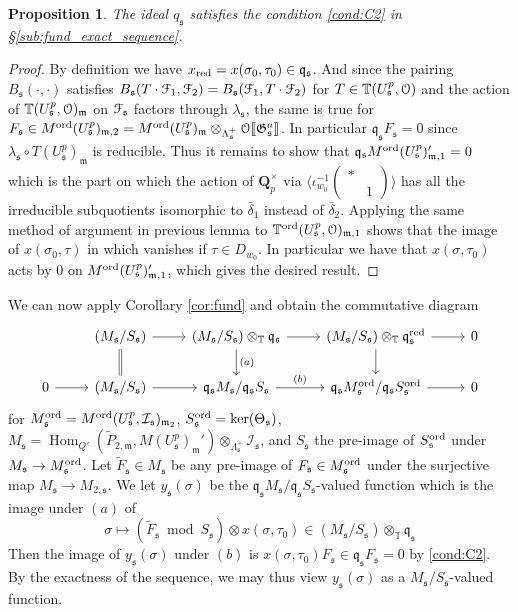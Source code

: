 \documentclass[leqno]{amsart}
\newtheorem{prop}[thm]{Proposition}
\theoremstyle{definition}
\theoremstyle{remark}
\newcommand{\smat}[1]{\left(\begin{smallmatrix} #1 \end{smallmatrix}\right)}
\newcommand{\eo}{\EuScript{O}}
\newcommand{\Qp}{\mathbf{Q}_p}
\DeclareMathOperator{\Hom}{Hom}
\newcommand{\fm}{\mathfrak{m}}
\newcommand{\fq}{\mathfrak{q}}
\newcommand{\fs}{\mathfrak{s}}
\newcommand{\red}{\textnormal{red}}
\newcommand{\xx}{x_\textnormal{red}}
\newcommand{\fG}{\mathfrak{G}}
\newcommand{\TT}{\mathbb{T}} %
\newcommand{\euF}{\EuScript{F}} %
\newcommand{\I}{\mathcal{I}} %
\newcommand{\ord}{\textnormal{ord}} %
\begin{document}
\begin{prop}
The ideal  $q_{\fs}$
satisfies the condition \ref{cond:C2}
in \S\ref{sub:fund_exact_sequence}.
\end{prop}

\begin{proof}

By definition we have $\xx=x(\sigma_0,\tau_0)\in \fq_\fs$.
And since the pairing 
$B_\fs(\cdot,\cdot)$ satisfies
$B_\fs(T\cdot \euF_1,\euF_2)=B_\fs(\euF_1,T\cdot \euF_2)$
for $T\in \TT(U^p_\fs,\eo)$
and the action of $\TT(U^p_\fs,\eo)_\fm$
on $\euF_\fs$ factors through $\lambda_\fs$,
the same is true for 
$F_\fs\in M^{\ord}(U^p_\fs)_{\fm,2}=
M^{\ord}(U^p_\fs)_\fm\otimes_{\Lambda^+_\fs}
\eo\llbracket\fG_\fs^a\rrbracket$.
In particular $\fq_\fs F_\fs=0$
since $\lambda_\fs\circ T(U^p_\fs)_\fm$
is reducible.
Thus it remains to show that 
$\fq_\fs M^{\ord}(U^p_\fs)'_{\fm,1}=0$
which is the part on which the action of $\Qp^\times$
via $\langle\iota_{w_0}^{-1}\smat{*&\\&1}\rangle$
has all the irreducible subquotients
isomorphic to $\bar{\delta}_1$ instead of $\bar{\delta}_2$.
Applying the same method of argument
in previous lemma to $\TT^{\ord}(U^p_\fs,\eo)_{\fm,1}$
shows that the image of $x(\sigma_0,\tau)$
in which vanishes if $\tau\in D_{w_0}$.
In particular we have that $x(\sigma,\tau_0)$
acts by $0$ on $M^{\ord}(U^p_\fs)'_{\fm,1}$,
which gives the desired result.

\end{proof}


We can now apply Corollary \ref{cor:fund} 
and obtain the commutative diagram
\begin{equation}
    \begin{tikzcd}
    & (M_\fs/S_\fs)
    \arrow[r]\arrow[d,equal] &
    (M_\fs/S_\fs)\otimes_{\TT}\fq_\fs
    \arrow[r]\arrow[d,"(a)"] &
    (M_\fs/S_\fs)\otimes_{\TT}\fq_\fs^\red
    \arrow[r]\arrow[d] &0\\
    0\arrow[r] &
    (M_\fs/S_\fs)
    \arrow[r] &
    \fq_\fs M_\fs/\fq_\fs S_\fs
    \arrow[r,"(b)"] &
    \fq_\fs M^{\ord}_{\fs}/\fq_\fs S^{\ord}_{\fs}
    \arrow[r] &0
    \end{tikzcd}
\end{equation}
for $M^{\ord}_{\fs}=M^{\ord}(U^p_\fs,\I_\fs)_{\fm_2}$,
$S^{\ord}_{\fs}=\ker(\Theta_\fs)$,
$M_\fs=\Hom_{Q'}(\tilde{P}_{2,\fm},M(U^p_\fs)_{\fm}')
\otimes_{\Lambda_{\fs}^+}\I_\fs$,
and $S_\fs$ the pre-image of $S^{\ord}_\fs$
under $M_\fs\to M^{\ord}_\fs$.
Let $\tilde{F}_\fs\in M_\fs$
be any pre-image of $F_\fs\in M^{\ord}_{\fs}$
under the surjective map $M_\fs\to M_{2,\fs}$.
We let $y_\fs(\sigma)$ be the 
$\fq_\fs M_\fs/\fq_\fs S_\fs$-valued function 
which is the image under $(a)$ of
\[
\sigma\mapsto 
(\tilde{F}_\fs\bmod S_\fs)\otimes x(\sigma,\tau_0)\in 
(M_\fs/S_\fs)\otimes_\TT\fq_\fs
\]
Then the image of $y_\fs(\sigma)$ under $(b)$
is $x(\sigma,\tau_0)F_\fs\in \fq_\fs F_\fs=0$ by \eqref{cond:C2}.
By the exactness of the sequence,
we may thus view $y_\fs(\sigma)$
as a $M_\fs/S_\fs$-valued function.
\end{document}
